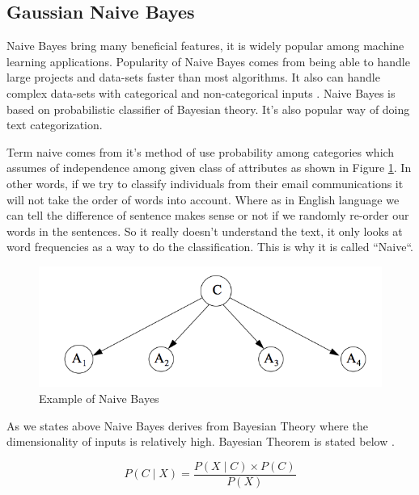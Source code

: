 \documentclass[sigconf]{acmart}
\begin{document}
\subsection{Gaussian Naive Bayes}
Naive Bayes bring many beneficial features, it is widely popular among machine learning applications\cite{tapan-kumar}. Popularity of Naive Bayes comes from being able to handle large projects and data-sets faster than most algorithms\cite{tapan-kumar}. It also can handle complex data-sets with categorical and non-categorical inputs \cite{tapan-kumar}. Naive Bayes is based on probabilistic classifier of Bayesian theory. It's also popular way of doing text categorization\cite{www-wikipedia-naivebayes}. 

\par Term naive comes from it's method of use probability among categories which assumes of independence among given class of attributes as shown in Figure \ref{fig:Naive Bayes}. In other words, if we try to classify individuals from their email communications it will not take the order of words into account. Where as in English language we can tell the difference of sentence makes sense or not if we randomly re-order our words in the sentences. So it really doesn't understand the text, it only looks at word frequencies as a way to do the classification. This is why it is called ``Naive``.  

 \begin{figure}[!ht]
    \centering
    \graphicspath{{images/}}
    \includegraphics[width=\columnwidth]{Naive-bayes}
    \caption{Example of Naive Bayes \cite{Zhang}}\label{fig:Naive Bayes}
\end{figure}


\par As we states above Naive Bayes derives from Bayesian Theory where the dimensionality of inputs is relatively high. Bayesian Theorem is stated below \cite{Sayali}.

\begin{equation}
P(C \mid X) = \frac{P(X \mid C) \times P(C)} {P(X)}
\end{equation}
\end{document}
